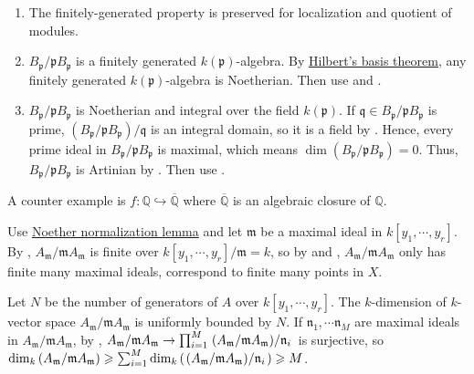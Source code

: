 \begin{exercise}\label{ex8.4}
	\begin{enumerate}
		\item[(i) $\Rightarrow$ (iii)] The finitely-generated property is preserved for localization and quotient of modules.
		\item[(ii) $\Rightarrow$ (iii)] $B_\mathfrak{p}/\mathfrak{p}B_\mathfrak{p}$ is a finitely generated $k(\mathfrak{p})$-algebra. By \hyperref[7.5]{Hilbert's basis theorem}, any finitely generated $k(\mathfrak{p})$-algebra is Noetherian. Then use  and .
		\item[(iii) $\Rightarrow$ (ii),(iv)] $B_\mathfrak{p}/\mathfrak{p}B_\mathfrak{p}$ is Noetherian and integral over the field $k(\mathfrak{p})$. If $\mathfrak{q}\in B_\mathfrak{p}/\mathfrak{p}B_\mathfrak{p}$ is prime, $\left(B_\mathfrak{p}/\mathfrak{p}B_\mathfrak{p}\right)/\mathfrak{q}$ is an integral domain, so it is a field by . Hence, every prime ideal in $B_\mathfrak{p}/\mathfrak{p}B_\mathfrak{p}$ is maximal, which means $\operatorname{dim}\left(B_\mathfrak{p}/\mathfrak{p}B_\mathfrak{p}\right)=0$. Thus, $B_\mathfrak{p}/\mathfrak{p}B_\mathfrak{p}$ is Artinian by . Then use . 
	\end{enumerate}
	A counter example is $f:\mathbb{Q}\hookrightarrow\overline{\mathbb{Q}}$ where $\overline{\mathbb{Q}}$ is an algebraic closure of $\mathbb{Q}$.
\end{exercise}

\begin{exercise}\label{ex8.5}
	Use \hyperref[noethernormalization]{Noether normalization lemma} and let $\mathfrak{m}$ be a maximal ideal in $k\left[y_1,\cdots,y_r\right]$. By , $A_\mathfrak{m}/\mathfrak{m}A_\mathfrak{m}$ is finite over $k\left[y_1,\cdots,y_r\right]/\mathfrak{m}=k$, so by  and , $A_\mathfrak{m}/\mathfrak{m}A_\mathfrak{m}$ only has finite many maximal ideals, correspond to finite many points in $X$.
	
	Let $N$ be the number of generators of $A$ over $k\left[y_1,\cdots,y_r\right]$. The $k$-dimension of $k$-vector space $A_\mathfrak{m}/\mathfrak{m}A_\mathfrak{m}$ is uniformly bounded by $N$. If $\mathfrak{n}_1,\cdots\mathfrak{n}_M$ are maximal ideals in $A_\mathfrak{m}/\mathfrak{m}A_\mathfrak{m}$, by , $A_\mathfrak{m}/\mathfrak{m}A_\mathfrak{m}\rightarrow\prod_{i=1}^M\left.\left(A_\mathfrak{m}/\mathfrak{m}A_\mathfrak{m}\right)\middle/\mathfrak{n}_i\right.$ is surjective, so $\dim_k\left(A_\mathfrak{m}/\mathfrak{m}A_\mathfrak{m}\right)\geqslant\sum_{i=1}^M\dim_k\left(\left.\left(A_\mathfrak{m}/\mathfrak{m}A_\mathfrak{m}\right)\middle/\mathfrak{n}_i\right.\right)\geqslant M$.
\end{exercise}

